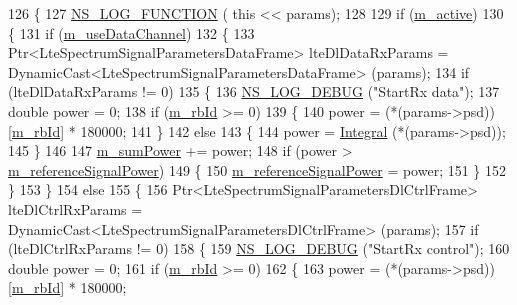 \begin{DoxyCode}
126 \{
127   \hyperlink{log-macros-disabled_8h_a90b90d5bad1f39cb1b64923ea94c0761}{NS\_LOG\_FUNCTION} ( \textcolor{keyword}{this} << params);
128 
129   \textcolor{keywordflow}{if} (\hyperlink{classns3_1_1RemSpectrumPhy_aaf04013201d8b634bdd992d6982f4415}{m\_active})
130     \{
131       \textcolor{keywordflow}{if} (\hyperlink{classns3_1_1RemSpectrumPhy_af2cc6a40b67d0d47bbddfee708479779}{m\_useDataChannel})
132         \{
133           Ptr<LteSpectrumSignalParametersDataFrame> lteDlDataRxParams = 
      DynamicCast<LteSpectrumSignalParametersDataFrame> (params);
134           \textcolor{keywordflow}{if} (lteDlDataRxParams != 0)
135             \{
136               \hyperlink{group__logging_ga413f1886406d49f59a6a0a89b77b4d0a}{NS\_LOG\_DEBUG} (\textcolor{stringliteral}{"StartRx data"});
137               \textcolor{keywordtype}{double} power = 0;
138               \textcolor{keywordflow}{if} (\hyperlink{classns3_1_1RemSpectrumPhy_a24612833420c9d757f2c83f3ce5d50b3}{m\_rbId} >= 0)
139                 \{
140                   power = (*(params->psd))[\hyperlink{classns3_1_1RemSpectrumPhy_a24612833420c9d757f2c83f3ce5d50b3}{m\_rbId}] * 180000;
141                 \}
142               \textcolor{keywordflow}{else}
143                 \{
144                   power = \hyperlink{namespacens3_a3dd3817567502f8bc77b04e47134c070}{Integral} (*(params->psd));
145                 \}
146 
147               \hyperlink{classns3_1_1RemSpectrumPhy_aa04c880a3c709f7125e1817845818517}{m\_sumPower} += power;
148               \textcolor{keywordflow}{if} (power > \hyperlink{classns3_1_1RemSpectrumPhy_a122a4b069be17e97c1df646a9d4f4506}{m\_referenceSignalPower})
149                 \{
150                   \hyperlink{classns3_1_1RemSpectrumPhy_a122a4b069be17e97c1df646a9d4f4506}{m\_referenceSignalPower} = power;
151                 \}
152             \}
153         \}
154       \textcolor{keywordflow}{else}
155         \{
156           Ptr<LteSpectrumSignalParametersDlCtrlFrame> lteDlCtrlRxParams = 
      DynamicCast<LteSpectrumSignalParametersDlCtrlFrame> (params);
157           \textcolor{keywordflow}{if} (lteDlCtrlRxParams != 0)
158             \{
159               \hyperlink{group__logging_ga413f1886406d49f59a6a0a89b77b4d0a}{NS\_LOG\_DEBUG} (\textcolor{stringliteral}{"StartRx control"});
160               \textcolor{keywordtype}{double} power = 0;
161               \textcolor{keywordflow}{if} (\hyperlink{classns3_1_1RemSpectrumPhy_a24612833420c9d757f2c83f3ce5d50b3}{m\_rbId} >= 0)
162                 \{
163                   power = (*(params->psd))[\hyperlink{classns3_1_1RemSpectrumPhy_a24612833420c9d757f2c83f3ce5d50b3}{m\_rbId}] * 180000;

\end{DoxyCode}

